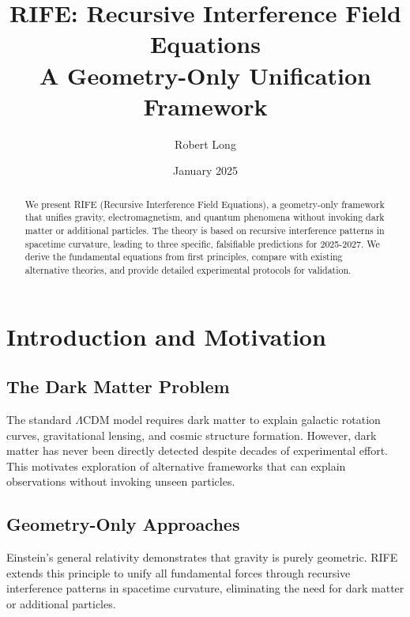\documentclass[11pt]{article}
\title{RIFE: Recursive Interference Field Equations \\[4pt] \large A Geometry-Only Unification Framework}
\author{Robert Long}
\date{January 2025}
\newcommand{\lamcdm}{$\Lambda$CDM}
\begin{document}
\maketitle

\begin{abstract}
We present RIFE (Recursive Interference Field Equations), a geometry-only framework that unifies gravity, electromagnetism, and quantum phenomena without invoking dark matter or additional particles. The theory is based on recursive interference patterns in spacetime curvature, leading to three specific, falsifiable predictions for 2025-2027. We derive the fundamental equations from first principles, compare with existing alternative theories, and provide detailed experimental protocols for validation.
\end{abstract}

\tableofcontents
\clearpage

\section{Introduction and Motivation}

\subsection{The Dark Matter Problem}
The standard \lamcdm{} model requires dark matter to explain galactic rotation curves, gravitational lensing, and cosmic structure formation. However, dark matter has never been directly detected despite decades of experimental effort. This motivates exploration of alternative frameworks that can explain observations without invoking unseen particles.

\subsection{Geometry-Only Approaches}
Einstein's general relativity demonstrates that gravity is purely geometric. RIFE extends this principle to unify all fundamental forces through recursive interference patterns in spacetime curvature, eliminating the need for dark matter or additional particles.

\end{document}
